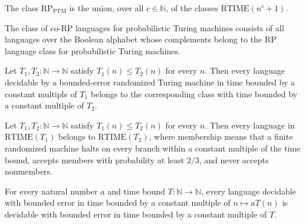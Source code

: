 \begin{definition}
\label{Randomized.RP_PTM}
\leanok
{}
The class $\mathrm{RP}_{\mathrm{PTM}}$ is the union, over all $c\in\mathbb{N}$, of the
classes $\mathrm{RTIME}(n^c+1)$.
\end{definition}

\begin{definition}
\label{Randomized.coRP_PTM}
\leanok
{}
The class of co-RP languages for probabilistic Turing machines consists of all languages
over the Boolean alphabet whose complements belong to the RP language class for
probabilistic Turing machines.
\end{definition}

\begin{theorem}
\label{Randomized.BPTIME.mono}
\leanok
{}
Let $T_1,T_2:\mathbb{N}\to\mathbb{N}$ satisfy $T_1(n)\le T_2(n)$ for every $n$. Then
every language decidable by a bounded-error randomized Turing machine in time bounded by
a constant multiple of $T_1$ belongs to the corresponding class with time bounded by a
constant multiple of $T_2$.
\end{theorem}

\begin{theorem}
\label{Randomized.RTIME.mono}
\leanok
{}
Let $T_1,T_2 : \mathbb{N} \to \mathbb{N}$ satisfy $T_1(n) \le T_2(n)$ for every $n$.
Then every language in $\mathrm{RTIME}(T_1)$ belongs to $\mathrm{RTIME}(T_2)$, where
membership means that a finite randomized machine halts on every branch within a
constant multiple of the time bound, accepts members with probability at least $2/3$,
and never accepts nonmembers.
\end{theorem}

\begin{theorem}
\label{Randomized.BPTIME_const_mul_subset}
\leanok
{}
For every natural number $a$ and time bound $T : \mathbb{N} \to \mathbb{N}$, every
language decidable with bounded error in time bounded by a constant multiple of $n
\mapsto aT(n)$ is decidable with bounded error in time bounded by a constant multiple of
$T$.
\end{theorem}

